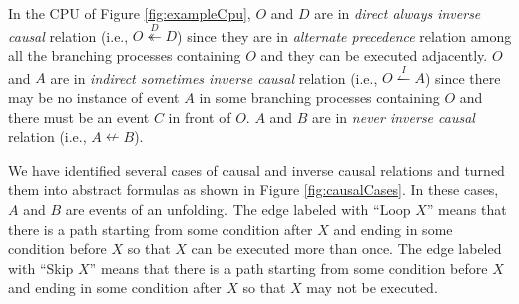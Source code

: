 \documentclass{llncs}
\begin{document}


\begin{example}
In the CPU of Figure \ref{fig:exampleCpu}, $O$ and $D$ are in \textit{direct always inverse causal} relation (i.e., $O\overset{D}{\twoheadleftarrow}D$) since they are in \textit{alternate precedence} relation among all the branching processes containing $O$ and they can be executed adjacently. $O$ and $A$ are in \textit{indirect sometimes inverse causal} relation (i.e., $O\overset{I}{\leftharpoonup}A$) since there may be no instance of event $A$ in some branching processes containing $O$ and there must be an event $C$ in front of $O$. $A$ and $B$ are in \textit{never inverse causal} relation (i.e., $A\nleftarrow B$).
\end{example}

We have identified several cases of causal and inverse causal relations and turned them into abstract formulas as shown in Figure \ref{fig:causalCases}. In these cases, $A$ and $B$ are events of an unfolding. The edge labeled with ``Loop $X$'' means that there is a path starting from some condition after $X$ and ending in some condition before $X$ so that $X$ can be executed more than once. The edge labeled with ``Skip $X$'' means that there is a path starting from some condition before $X$ and ending in some condition after $X$ so that $X$ may not be executed. %
\end{document}
